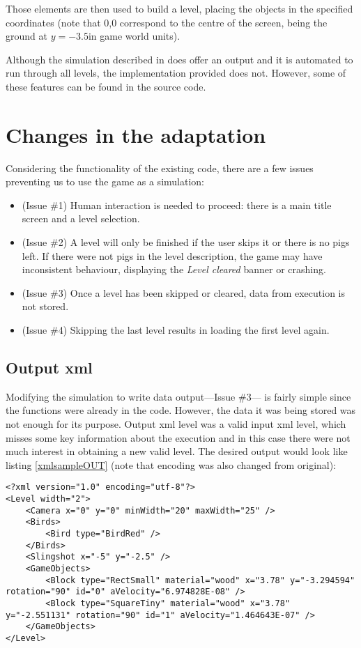 Those elements are then used to build a level, placing the objects in the specified coordinates (note that 0,0 correspond to the centre of the screen, being the ground at $y=-3.5$in game world units).

Although the simulation described in \cite{ferreira2014search} does offer an output and it is automated to run through all levels, the implementation provided does not. However, some of these features can be found in the source code.

\section{Changes in the adaptation}
Considering the functionality of the existing code, there are a few issues preventing us to use the game as a simulation:

\begin{itemize}
	\item (Issue \#1) Human interaction is needed to proceed: there is a main title screen and a level selection.
	\item (Issue \#2) A level will only be finished if the user skips it or there is no pigs left. If there were not pigs in the level description, the game may have inconsistent behaviour, displaying the \textit{Level cleared} banner or crashing.
	\item (Issue \#3) Once a level has been skipped or cleared, data from execution is not stored.
	\item (Issue \#4) Skipping the last level results in loading the first level again. 
\end{itemize}


\subsection{Output xml}

Modifying the simulation to write data output---Issue \#3--- is fairly simple since the functions were already in the code. However, the data it was being stored was not enough for its purpose. Output xml level was a valid input xml level, which misses some key information about the execution and in this case there were not much interest in obtaining a new valid level. The desired output would look like listing \ref{xmlsampleOUT} (note that encoding was also changed from original):

\lstset{language=XML}
\begin{lstlisting}[caption=Sample level output to show format, label=xmlsampleOUT]
<?xml version="1.0" encoding="utf-8"?>
<Level width="2">
	<Camera x="0" y="0" minWidth="20" maxWidth="25" />
	<Birds>
		<Bird type="BirdRed" />
	</Birds>
	<Slingshot x="-5" y="-2.5" />
	<GameObjects>
		<Block type="RectSmall" material="wood" x="3.78" y="-3.294594" rotation="90" id="0" aVelocity="6.974828E-08" />
		<Block type="SquareTiny" material="wood" x="3.78" y="-2.551131" rotation="90" id="1" aVelocity="1.464643E-07" />
	</GameObjects>
</Level>
\end{lstlisting}

